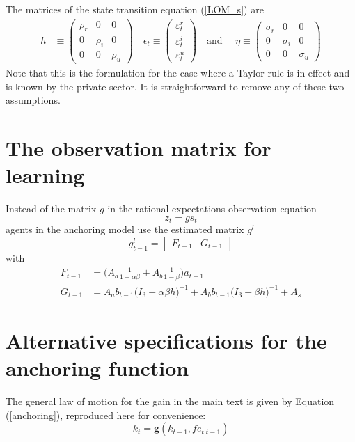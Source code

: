 \documentclass[11pt]{article}
\renewcommand{\[}{\begin{equation}}
\renewcommand{\]}{\end{equation}}
\begin{document}
The matrices of the state transition equation (\ref{LOM_s}) are
 \begin{align}
 h  & \equiv \begin{pmatrix} \rho_r & 0 & 0 \\ 0& \rho_i & 0 \\ 0&0& \rho_u 
 \end{pmatrix}  \quad 
 \epsilon_t \equiv \begin{pmatrix}\varepsilon_t^{r} \\ \varepsilon_t^{i}  \\ \varepsilon_t^{u} 
 \end{pmatrix}  \quad  \text{and } \quad \eta  \equiv \begin{pmatrix} \sigma_r & 0 & 0 \\ 0& \sigma_i & 0 \\ 0&0& \sigma_u 
 \end{pmatrix} 
 \end{align}
Note that this is the formulation for the case where a Taylor rule is in effect and is known by the private sector. It is straightforward to remove any of these two assumptions.



\section{The observation matrix for learning}\label{app_FG}
Instead of the matrix $g$ in the rational expectations observation equation
\begin{equation}
z_t = g s_t \label{RE_obs}
\end{equation}
agents in the anchoring model use the estimated matrix $g^l$
\begin{equation}
g_{t-1}^l = \begin{bmatrix} F_{t-1} & G_{t-1} \end{bmatrix}
\end{equation}
with
\begin{align}
F_{t-1} & = \bigg(A_a \frac{1}{1-\alpha\beta} + A_b\frac{1}{1-\beta} \bigg)a_{t-1}\\
G_{t-1} & = A_a b_{t-1}\bigg(I_3 - \alpha\beta h \bigg)^{-1} + A_b b_{t-1}\bigg(I_3 - \beta h \bigg)^{-1} + A_s
\end{align}

\section{Alternative specifications for the anchoring function}\label{alternative_criteria}
The general law of motion for the gain in the main text is given by Equation (\ref{anchoring}), reproduced here for convenience:
\begin{equation}
k_t  = \mathbf{g}(k_{t-1},fe_{t|t-1}) 
\end{equation}
\end{document}
